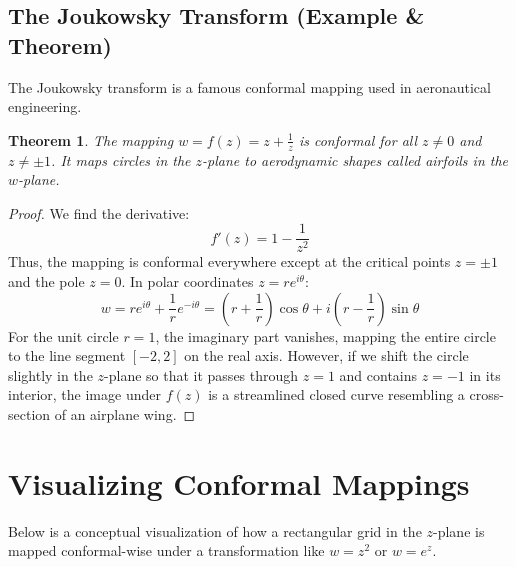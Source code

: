 \documentclass[12pt,a4paper]{article}
\newtheorem{theorem}{Theorem}[section]
\begin{document}
\subsection{The Joukowsky Transform (Example \& Theorem)}
The Joukowsky transform is a famous conformal mapping used in aeronautical engineering.
\begin{theorem}
The mapping $w = f(z) = z + \frac{1}{z}$ is conformal for all $z \neq 0$ and $z \neq \pm 1$. It maps circles in the $z$-plane to aerodynamic shapes called airfoils in the $w$-plane.
\end{theorem}
\begin{proof}
We find the derivative:
\begin{equation}
    f'(z) = 1 - \frac{1}{z^2}
\end{equation}
Thus, the mapping is conformal everywhere except at the critical points $z = \pm 1$ and the pole $z = 0$. In polar coordinates $z = re^{i\theta}$:
\begin{equation}
    w = re^{i\theta} + \frac{1}{r}e^{-i\theta} = \left( r + \frac{1}{r} \right)\cos\theta + i \left( r - \frac{1}{r} \right)\sin\theta
\end{equation}
For the unit circle $r = 1$, the imaginary part vanishes, mapping the entire circle to the line segment $[-2, 2]$ on the real axis. However, if we shift the circle slightly in the $z$-plane so that it passes through $z = 1$ and contains $z = -1$ in its interior, the image under $f(z)$ is a streamlined closed curve resembling a cross-section of an airplane wing.
\end{proof}

\section{Visualizing Conformal Mappings}
Below is a conceptual visualization of how a rectangular grid in the $z$-plane is mapped conformal-wise under a transformation like $w = z^2$ or $w = e^z$.
\end{document}
